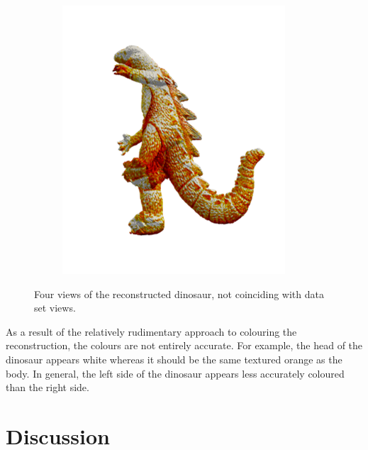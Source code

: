 \begin{figure}[ht]
\begin{subfigure}[b]{0.4\textwidth}
    \caption{}
  \end{subfigure}
  \hspace{4em}
  \begin{subfigure}[b]{0.4\textwidth}
    \centering
    \includegraphics[width=\textwidth]{images/q2_dino_view_4.png}
    \caption{}
  \end{subfigure}
  \caption{Four views of the reconstructed dinosaur, not coinciding with data set views.}
  \label{fig:dino_views}
\end{figure}

As a result of the relatively rudimentary approach to colouring the reconstruction, the colours are not entirely accurate. For example, the head of the dinosaur appears white whereas it should be the same textured orange as the body. In general, the left side of the dinosaur appears less accurately coloured than the right side.

\newpage
\section{Discussion}

